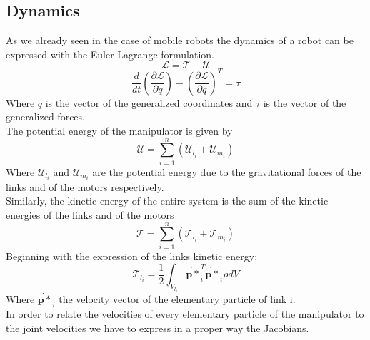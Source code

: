 \subsection{Dynamics}
\label{sec:dynamics}
As we already seen in the case of mobile robots the dynamics of a robot can be expressed with the Euler-Lagrange formulation.
\begin{equation*}
	\mathcal{L}=\mathcal{T}-\mathcal{U}
\end{equation*}
\begin{equation*}
	\frac{d}{dt}\left(\frac{\partial\mathcal{L}}{\partial\dot{q}} \right) - \left(\frac{\partial\mathcal{L}}{\partial q} \right)^T=\tau
\end{equation*}
Where $q$ is the vector of the generalized coordinates and $\tau$ is the vector of the generalized forces.\\
The potential energy of the manipulator is given by
\begin{equation}
	\mathcal{U} = \sum_{i=1}^{n}\left(\mathcal{U}_{l_i}+\mathcal{U}_{m_i}\right)
\end{equation}
Where $\mathcal{U}_{l_i}$ and $\mathcal{U}_{m_i}$ are the potential energy due to the gravitational forces of the links and of the motors respectively.\\
Similarly, the kinetic energy of the entire system is the sum of the kinetic energies of the links and of the motors 
\begin{equation}
	\mathcal{T} = \sum_{i=1}^{n}\left(\mathcal{T}_{l_i}+\mathcal{T}_{m_i}\right)
\end{equation}
Beginning with the expression of the links kinetic energy:
\begin{equation}
	\mathcal{T}_{l_i}=\frac{1}{2}\int_{V_{l_i}}\dot{\mathbf{p}*}_i^T\dot{\mathbf{p}*}_i\rho dV
\end{equation}
Where $\dot{\mathbf{p}*}_i$ the velocity vector of the elementary particle of link i.\\
In order to relate the velocities of every elementary particle of the manipulator to the joint velocities we have to express in a proper way the Jacobians.

